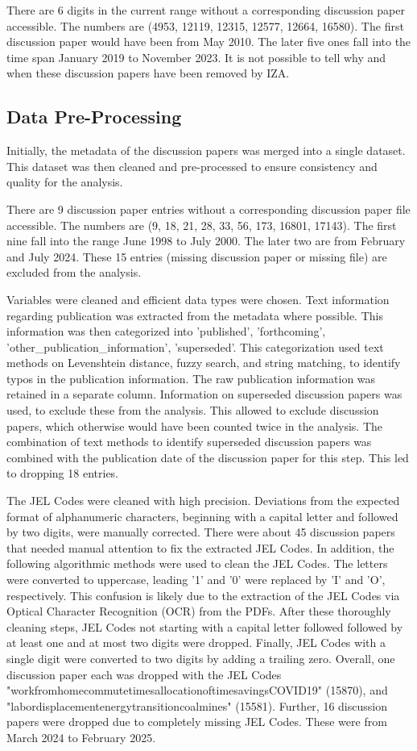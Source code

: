 \documentclass[11pt, a4paper, leqno]{article}
\begin{document}
There are 6 digits in the current range without a corresponding discussion paper accessible.
The numbers are (4953, 12119, 12315, 12577, 12664, 16580).
The first discussion paper would have been from May 2010.
The later five ones fall into the time span January 2019 to November 2023.
It is not possible to tell why and when these discussion papers have been removed by IZA.

\subsection{Data Pre-Processing}
Initially, the metadata of the discussion papers was merged into a single dataset.
This dataset was then cleaned and pre-processed to ensure consistency and quality for the analysis.

There are 9 discussion paper entries without a corresponding discussion paper file accessible.
The numbers are (9, 18, 21, 28, 33, 56, 173, 16801, 17143).
The first nine fall into the range June 1998 to July 2000.
The later two are from February and July 2024.
These 15 entries (missing discussion paper or missing file) are excluded from the analysis.

Variables were cleaned and efficient data types were chosen.
Text information regarding publication was extracted from the metadata where possible.
This information was then categorized into 'published', 'forthcoming', 'other\_publication\_information', 'superseded'.
This categorization used text methods on Levenshtein distance, fuzzy search, and string matching, to identify typos in the publication information.
The raw publication information was retained in a separate column.
Information on superseded discussion papers was used, to exclude these from the analysis.
This allowed to exclude discussion papers, which otherwise would have been counted twice in the analysis.
The combination of text methods to identify superseded discussion papers was combined with the publication date of the discussion paper for this step.
This led to dropping 18 entries.

The JEL Codes were cleaned with high precision.
Deviations from the expected format of alphanumeric characters, beginning with a capital letter and followed by two digits, were manually corrected.
There were about 45 discussion papers that needed manual attention to fix the extracted JEL Codes.
In addition, the following algorithmic methods were used to clean the JEL Codes.
The letters were converted to uppercase, leading '1' and '0' were replaced by 'I' and 'O', respectively.
This confusion is likely due to the extraction of the JEL Codes via Optical Character Recognition (OCR) from the PDFs.
After these thoroughly cleaning steps, JEL Codes not starting with a capital letter followed followed by at least one and at most two digits were dropped.
Finally, JEL Codes with a single digit were converted to two digits by adding a trailing zero.
Overall, one discussion paper each was dropped with the JEL Codes "workfromhomecommutetimesallocationoftimesavingsCOVID19" (15870), and
"labordisplacementenergytransitioncoalmines" (15581).
Further, 16 discussion papers were dropped due to completely missing JEL Codes. These were from March 2024 to February 2025.
\end{document}
